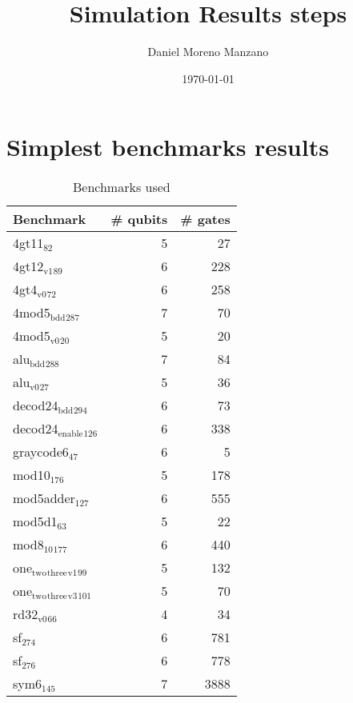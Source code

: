 \documentclass[11pt]{article}
\author{Daniel Moreno Manzano}
\date{\today}
\title{Simulation Results steps}
\begin{document}
\maketitle


\section{Simplest benchmarks results}
\label{sec:orgb3d6756}

\begin{table}[!htpb]
\caption{\label{tab:org023864f}
Benchmarks used}
\centering
\begin{tabular}{lrr}
\hline
Benchmark & \# qubits & \# gates\\
\hline
4gt11\(_{\text{82}}\) & 5 & 27\\
4gt12\(_{\text{v1}}\)\(_{\text{89}}\) & 6 & 228\\
4gt4\(_{\text{v0}}\)\(_{\text{72}}\) & 6 & 258\\
4mod5\(_{\text{bdd}}\)\(_{\text{287}}\) & 7 & 70\\
4mod5\(_{\text{v0}}\)\(_{\text{20}}\) & 5 & 20\\
alu\(_{\text{bdd}}\)\(_{\text{288}}\) & 7 & 84\\
alu\(_{\text{v0}}\)\(_{\text{27}}\) & 5 & 36\\
decod24\(_{\text{bdd}}\)\(_{\text{294}}\) & 6 & 73\\
decod24\(_{\text{enable}}\)\(_{\text{126}}\) & 6 & 338\\
graycode6\(_{\text{47}}\) & 6 & 5\\
mod10\(_{\text{176}}\) & 5 & 178\\
mod5adder\(_{\text{127}}\) & 6 & 555\\
mod5d1\(_{\text{63}}\) & 5 & 22\\
mod8\(_{\text{10}}\)\(_{\text{177}}\) & 6 & 440\\
one\(_{\text{two}}\)\(_{\text{three}}\)\(_{\text{v1}}\)\(_{\text{99}}\) & 5 & 132\\
one\(_{\text{two}}\)\(_{\text{three}}\)\(_{\text{v3}}\)\(_{\text{101}}\) & 5 & 70\\
rd32\(_{\text{v0}}\)\(_{\text{66}}\) & 4 & 34\\
sf\(_{\text{274}}\) & 6 & 781\\
sf\(_{\text{276}}\) & 6 & 778\\
sym6\(_{\text{145}}\) & 7 & 3888\\
\hline
\end{tabular}
\end{table}
\end{document}
